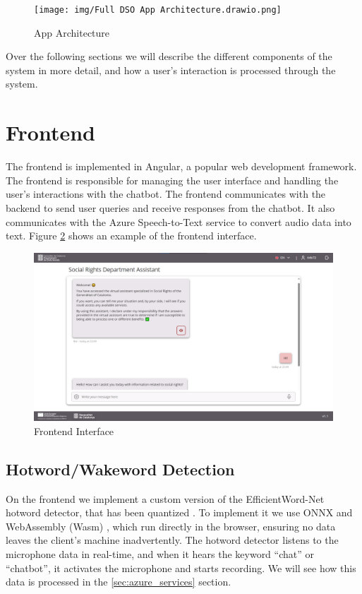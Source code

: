 \documentclass[a4paper,12pt,twoside]{ThesisStyle}
\begin{document}
\begin{figure}[htb]
  \centering
  \texttt{[image: img/Full DSO App Architecture.drawio.png]}
  \caption{App Architecture}
  \label{fig:architecture}
\end{figure}

Over the following sections we will describe the different components of the system in more detail, and how a user's interaction is processed through the system.

\section{Frontend}
\label{sec:frontend}

The frontend is implemented in Angular, a popular web development framework. The frontend is responsible for managing the user interface and handling the user's interactions with the chatbot. The frontend communicates with the backend to send user queries and receive responses from the chatbot. It also communicates with the Azure Speech-to-Text service to convert audio data into text. Figure \ref{fig:frontend} shows an example of the frontend interface.

\begin{figure}[htb]
  \centering
  \includegraphics[width=1\textwidth]{img/UI Design.png}
  \caption{Frontend Interface}
  \label{fig:frontend}
\end{figure}

\subsection{Hotword/Wakeword Detection}
\label{subsec:hotword_detection}

On the frontend we implement a custom version of the EfficientWord-Net \cite{Chidhambararajan2022EfficientWordNet} hotword detector, that has been quantized \cite{Zhang2023PostTrainingQuantizationNeuralNetworks}. To implement it we use ONNX \cite{onnx} and WebAssembly (Wasm) \cite{wasm}, which run directly in the browser, ensuring no data leaves the client's machine inadvertently. The hotword detector listens to the microphone data in real-time, and when it hears the keyword ``chat'' or ``chatbot'', it activates the microphone and starts recording. We will see how this data is processed in the \ref{sec:azure_services} section.
\end{document}
